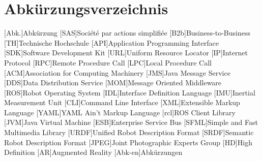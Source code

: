 
\chapter*{Abkürzungsverzeichnis}                   %

\begin{acronym}[DHBW]
  [Abk.]{Abkürzung}
  [SAS]{Société par actions simplifiée}
  [B2b]{Business-to-Business}
  [TH]{Technische Hochschule}
  [API]{Application Programming Interface}
  [SDK]{Software Development Kit}
  [URL]{Uniform Resource Locator}
  [IP]{Internet Protocol}
  [RPC]{Remote Procedure Call}
  [LPC]{Local Procedure Call}
  [ACM]{Association for Computing Machinery}
  [JMS]{Java Message Service}
  [DDS]{Data Distribution Service}
  [MOM]{Message Oriented Middleware}
  [ROS]{Robot Operating System}
  [IDL]{Interface Definition Language}
  [IMU]{Inertial Measurement Unit}
  [CLI]{Command Line Interface}
  [XML]{Extensible Markup Language}
  [YAML]{YAML Ain't Markup Language}
  [rcl]{ROS Client Library}
  [JVM]{Java Virtual Machine}
  [ESB]{Enterprise Service Bus}
  [SFML]{Simple and Fast Multimedia Library}
  [URDF]{Unified Robot Description Format}
  [SRDF]{Semantic Robot Description Format}
  [JPEG]{Joint Photographic Experts Group}
  [HD]{High Definition}
  [AR]{Augmented Reality}
  [Abk-en]{Abkürzungen}
\end{acronym}
